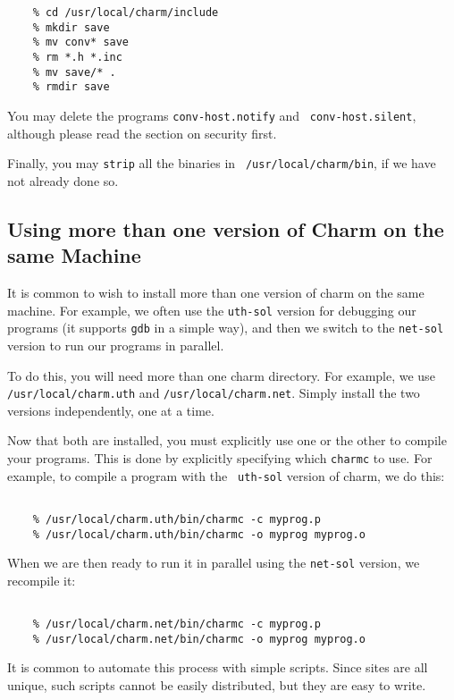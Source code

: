 \begin{verbatim}
    % cd /usr/local/charm/include
    % mkdir save
    % mv conv* save
    % rm *.h *.inc
    % mv save/* .
    % rmdir save
\end{verbatim}

You may delete the programs {\tt conv-host.notify} and {\tt
conv-host.silent}, although please read the section on security first.

Finally, you may {\tt strip} all the binaries in {\tt
/usr/local/charm/bin}, if we have not already done so.

\subsection{Using more than one version of Charm on the same Machine}

It is common to wish to install more than one version of charm on the
same machine.  For example, we often use the {\tt uth-sol} version for
debugging our programs (it supports {\tt gdb} in a simple way), and
then we switch to the {\tt net-sol} version to run our programs in
parallel.

To do this, you will need more than one charm directory.  For example,
we use {\tt /usr/local/charm.uth} and {\tt /usr/local/charm.net}.
Simply install the two versions independently, one at a time.

Now that both are installed, you must explicitly use one or the other
to compile your programs.  This is done by explicitly specifying which
{\tt charmc} to use.  For example, to compile a program with the {\tt
uth-sol} version of charm, we do this:

\begin{verbatim}

    % /usr/local/charm.uth/bin/charmc -c myprog.p
    % /usr/local/charm.uth/bin/charmc -o myprog myprog.o

\end{verbatim}

When we are then ready to run it in parallel using the {\tt net-sol}
version, we recompile it:

\begin{verbatim}

    % /usr/local/charm.net/bin/charmc -c myprog.p
    % /usr/local/charm.net/bin/charmc -o myprog myprog.o

\end{verbatim}

It is common to automate this process with simple scripts.  Since sites
are all unique, such scripts cannot be easily distributed, but they are
easy to write.



